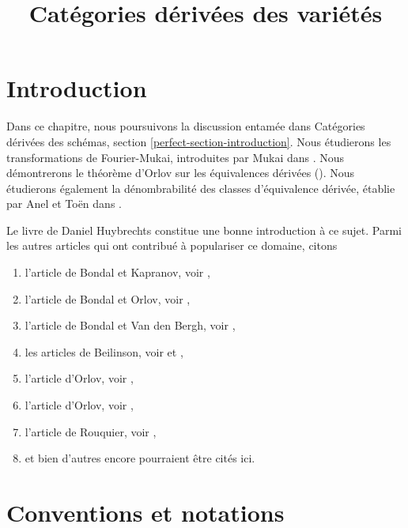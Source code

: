 

%


\title{Catégories dérivées des variétés}


\maketitle

\label{section-phantom}

\tableofcontents

\section{Introduction}
\label{section-introduction}

\noindent
Dans ce chapitre, nous poursuivons la discussion entamée dans
Catégories dérivées des schémas, section \ref{perfect-section-introduction}.
Nous étudierons les transformations de Fourier-Mukai,
introduites par Mukai dans \cite{Mukai}.
Nous démontrerons le théorème d'Orlov sur les équivalences dérivées (\cite{Orlov-K3}).
Nous étudierons également la dénombrabilité des classes d'équivalence dérivée,
établie par Anel et Toën dans \cite{AT}.

\medskip\noindent
Le livre de Daniel Huybrechts \cite{Huybrechts} constitue une bonne
introduction à ce sujet. Parmi les autres articles qui ont contribué
à populariser ce domaine, citons
\begin{enumerate}
\item l'article de Bondal et Kapranov, voir \cite{Bondal-Kapranov},
\item l'article de Bondal et Orlov, voir \cite{Bondal-Orlov},
\item l'article de Bondal et Van den Bergh, voir \cite{BvdB},
\item les articles de Beilinson, voir
\cite{Beilinson} et \cite{Beilinson-derived},
\item l'article d'Orlov, voir \cite{Orlov-AV},
\item l'article d'Orlov, voir \cite{Orlov-motives},
\item l'article de Rouquier, voir \cite{Rouquier-dimensions},
\item et bien d'autres encore pourraient être cités ici.
\end{enumerate}




\section{Conventions et notations}
\label{section-conventions}

